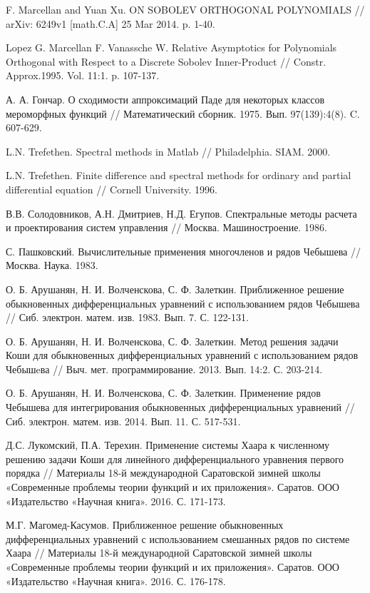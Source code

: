 \begin{thebibliography}{1}
 F. Marcellan and Yuan Xu. ON SOBOLEV ORTHOGONAL POLYNOMIALS // arXiv: 6249v1 [math.C.A] 25 Mar 2014. p. 1-40.

 Lopez G. Marcellan F. Vanassche W. Relative Asymptotics for Polynomials Orthogonal with Respect to a Discrete Sobolev Inner-Product // Constr. Approx.1995. Vol. 11:1. p. 107-137.

 А. А. Гончар. О сходимости аппроксимаций Паде для некоторых классов мероморфных функций // Математический сборник. 1975. Вып. 97(139):4(8). C. 607-629.

 L.N. Trefethen. Spectral methods in Matlab // Philadelphia. SIAM. 2000.

 L.N. Trefethen. Finite difference and spectral methods for ordinary and partial differential equation // Cornell University. 1996.

 В.В. Солодовников, А.Н. Дмитриев, Н.Д. Егупов. Спектральные методы расчета и проектирования систем управления // Москва. Машиностроение. 1986.

 С. Пашковский. Вычислительные применения многочленов и рядов Чебышева // Москва. Наука. 1983.

 О. Б. Арушанян, Н. И. Волченскова, С. Ф. Залеткин. Приближенное решение обыкновенных дифференциальных уравнений с использованием рядов Чебышева // Сиб. электрон. матем. изв. 1983. Вып. 7. С. 122-131.

 О. Б. Арушанян, Н. И. Волченскова, С. Ф. Залеткин. Метод решения задачи Коши для обыкновенных дифференциальных уравнений с использованием рядов Чебышeва // Выч. мет. программирование. 2013. Вып. 14:2. С. 203-214.

 О. Б. Арушанян, Н. И. Волченскова, С. Ф. Залеткин. Применение рядов Чебышева для интегрирования обыкновенных дифференциальных уравнений // Сиб. электрон. матем. изв. 2014. Вып. 11. С. 517-531.

 Д.С. Лукомский, П.А. Терехин. Применение системы Хаара к численному решению задачи Коши для линейного дифференциального уравнения первого порядка // Материалы 18-й международной Саратовской зимней школы «Современные проблемы теории функций и их приложения». Саратов. ООО «Издательство «Научная книга». 2016. С. 171-173.

 М.Г. Магомед-Касумов. Приближенное решение обыкновенных дифференциальных уравнений с использованием смешанных рядов по системе Хаара // Материалы 18-й международной Саратовской зимней школы «Современные проблемы теории функций и их приложения». Саратов. ООО «Издательство «Научная книга». 2016. С. 176-178.


\end{thebibliography}
